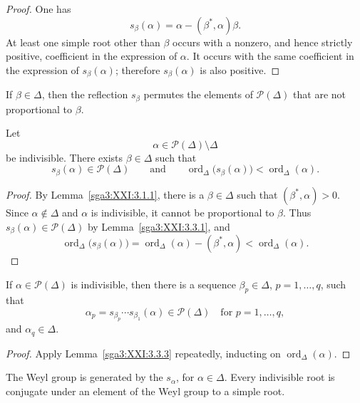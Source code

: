 \begin{proof}
One has
\[
 s_\beta(\alpha)=\alpha-(\beta^\ast,\alpha)\beta.
\]
At least one simple root other than \(\beta\) occurs with a nonzero,
and hence strictly positive, coefficient in the expression of
\(\alpha\). It occurs with the same coefficient in the expression of
\(s_\beta(\alpha)\); therefore \(s_\beta(\alpha)\) is also positive.
\end{proof}

\begin{corollary}\label{sga3:XXI:3.3.2}
If \(\beta\in\Delta\), then the reflection \(s_\beta\) permutes the
elements of \(\mathscr{P}(\Delta)\) that are not proportional to
\(\beta\).
\end{corollary}

\begin{lemma}\label{sga3:XXI:3.3.3}
Let
\[
 \alpha\in\mathscr{P}(\Delta)\setminus\Delta
\]
be indivisible. There exists \(\beta\in\Delta\) such that
\[
 s_\beta(\alpha)\in\mathscr{P}(\Delta)
 \qquad\text{and}\qquad
 \operatorname{ord}_\Delta\bigl(s_\beta(\alpha)\bigr)
   <\operatorname{ord}_\Delta(\alpha).
\]
\end{lemma}

\begin{proof}
By Lemma~\ref{sga3:XXI:3.1.1}, there is a \(\beta\in\Delta\) such
that \((\beta^\ast,\alpha)>0\). Since \(\alpha\notin\Delta\) and
\(\alpha\) is indivisible, it cannot be proportional to \(\beta\).
Thus \(s_\beta(\alpha)\in\mathscr{P}(\Delta)\) by
Lemma~\ref{sga3:XXI:3.3.1}, and
\[
 \operatorname{ord}_\Delta\bigl(s_\beta(\alpha)\bigr)
 =\operatorname{ord}_\Delta(\alpha)-(\beta^\ast,\alpha)
 <\operatorname{ord}_\Delta(\alpha).
\]
\end{proof}

\begin{corollary}\label{sga3:XXI:3.3.4}
If \(\alpha\in\mathscr{P}(\Delta)\) is indivisible, then there is a
sequence \(\beta_p\in\Delta\), \(p=1,\ldots,q\), such that
\[
 \alpha_p
 =s_{\beta_p}\cdots s_{\beta_1}(\alpha)
 \in\mathscr{P}(\Delta)
 \quad\text{for }p=1,\ldots,q,
\]
and \(\alpha_q\in\Delta\).
\end{corollary}

\begin{proof}
Apply Lemma~\ref{sga3:XXI:3.3.3} repeatedly, inducting on
\(\operatorname{ord}_\Delta(\alpha)\).
\end{proof}

\begin{proposition}\label{sga3:XXI:3.3.5}
The Weyl group is generated by the \(s_\alpha\), for
\(\alpha\in\Delta\). Every indivisible root is conjugate under an
element of the Weyl group to a simple root.
\end{proposition}

